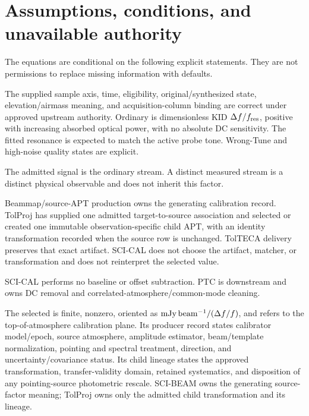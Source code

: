 \section{Assumptions, conditions, and unavailable authority}
\label{sec:assumptions}

The equations are conditional on the following explicit statements. They are
not permissions to replace missing information with defaults.

\begin{description}[style=nextline]
\item[\Assump{001}: upstream sample authority.]
  The supplied sample axis, time, eligibility, original/synthesized state,
  elevation/airmass meaning, and acquisition-column binding are correct under
  approved upstream authority. Ordinary  is dimensionless KID
  \(\Delta f/f_{\rm res}\), positive with increasing absorbed optical power,
  with no absolute DC sensitivity. The fitted resonance is expected to match
  the active probe tone. Wrong-Tune and high-noise quality states are explicit.

\item[\Assump{002}: ordinary measured channel.]
  The admitted signal is the ordinary  stream. A distinct measured
  stream is a distinct physical observable and does not inherit this factor.

\item[\Assump{003}: selected immutable child APT.]
  Beammap/source-APT production owns the generating calibration record.
  TolProj has supplied one admitted target-to-source association and selected
  or created one immutable observation-specific child APT, with an identity
  transformation recorded when the source row is unchanged. TolTECA delivery
  preserves that exact artifact. SCI-CAL does not choose the artifact,
  matcher, or transformation and does not reinterpret the selected value.

\item[\Assump{004}: no additive CAL operation.]
  SCI-CAL performs no baseline or offset subtraction. PTC is downstream and
  owns DC removal and correlated-atmosphere/common-mode cleaning.

\item[\Assump{005}: coefficient direction and reference plane.]
  The selected  is finite, nonzero, oriented as
  \(\mathrm{mJy\,beam^{-1}}/(\Delta f/f)\), and refers to the top-of-atmosphere calibration plane. Its
  producer record states calibrator model/epoch, source atmosphere, amplitude
  estimator, beam/template normalization, pointing and spectral treatment,
  direction, and uncertainty/covariance status. Its child lineage states the
  approved transformation, transfer-validity domain, retained systematics,
  and disposition of any pointing-source photometric rescale. SCI-BEAM owns
  the generating source-factor meaning; TolProj owns only the admitted child
  transformation and its lineage.


\end{description}
